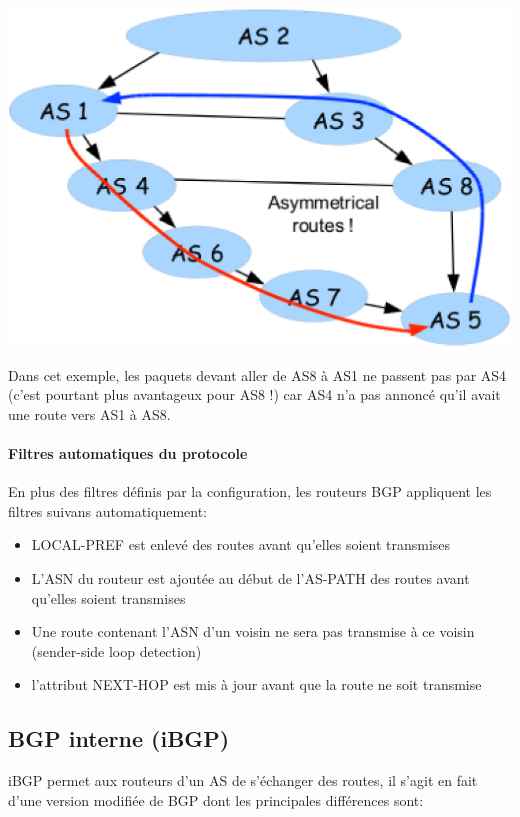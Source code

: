 \documentclass{report}
\begin{document}
\includegraphics[width=\textwidth]{asymetricalroutes.eps}

Dans cet exemple, les paquets devant aller de AS8 à AS1 ne passent pas
par AS4 (c'est pourtant plus avantageux pour AS8 !) car AS4 n'a pas
annoncé qu'il avait une route vers AS1 à AS8.

\paragraph{Filtres automatiques du protocole}

En plus des filtres définis par la configuration, les routeurs BGP
appliquent les filtres suivans automatiquement:

\begin{itemize}
\item LOCAL-PREF est enlevé des routes avant qu'elles soient transmises
\item L'ASN du routeur est ajoutée au début de l'AS-PATH des routes
  avant qu'elles soient transmises
\item Une route contenant l'ASN d'un voisin ne sera pas transmise à ce
  voisin (sender-side loop detection)
\item l'attribut NEXT-HOP est mis à jour avant que la route ne soit
  transmise
\end{itemize}

\subsection{BGP interne (iBGP)}

iBGP permet aux routeurs d'un AS de s'échanger des routes, il s'agit
en fait d'une version modifiée de BGP dont les principales différences
sont:
\end{document}
